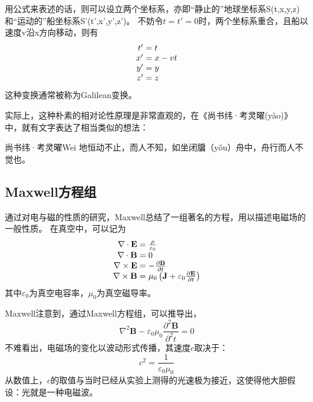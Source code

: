 用公式来表述的话，则可以设立两个坐标系，亦即“静止的”地球坐标系S(t,x,y,z)和“运动的”船坐标系S'(t',x',y',z')。
不妨令$t=t'=0$时，两个坐标系重合，且船以速度v沿x方向移动，则有
\begin{equation}
\begin{array}{r@{}l}
t' &{}= t \\
x' &{}= x-vt\\
y' &{}= y \\
z' &{}= z 
\end{array}\label{eq:galileo}
\end{equation}
这种变换通常被称为Galilean变换。

实际上，这种朴素的相对论性原理是非常直观的，在《尚书纬·考灵曜(y{\` a}o)》中，就有文字表达了相当类似的想法：
\begin{myprop}{尚书纬·考灵曜}{Wei}
地恒动不止，而人不知，如坐闭牖（y{\v o}u）舟中，舟行而人不觉也。
\end{myprop}

\subsection{Maxwell方程组}
通过对电与磁的性质的研究，Maxwell总结了一组著名的方程，用以描述电磁场的一般性质。
在真空中，可以记为
\begin{equation}
\begin{array}{r@{}l}
\nabla \cdot \mathbf {E} &{}= {\frac {\rho }{\varepsilon _{0}}}\\
\nabla \cdot \mathbf {B} &{}= 0\\
\nabla \times \mathbf {E}&{}=-{\frac {\partial \mathbf {B} }{\partial t}}\\
\nabla \times \mathbf {B}&{}=\mu _{0}\left(\mathbf {J} +\varepsilon _{0}{\frac {\partial \mathbf {E} }{\partial t}}\right)
\end{array}\label{eq:maxwell}
\end{equation}
其中$\varepsilon_0$为真空电容率，$\mu_0$为真空磁导率。

Maxwell注意到，通过Maxwell方程组，可以推导出，
\begin{equation}\label{eq:EMwave}
\nabla ^2 \mathbf {B} - \varepsilon_{0} \mu_0 \frac {\partial^2 \mathbf {B} }{\partial^2 t}= 0
\end{equation}
不难看出，电磁场的变化以波动形式传播，其速度$c$取决于：
\begin{equation}\label{eq:SpeedOfLight}
c^2 = \frac{1}{\varepsilon_0 \mu_0}
\end{equation} 
从数值上，$c$的取值与当时已经从实验上测得的光速极为接近，这使得他大胆假设：光就是一种电磁波。

